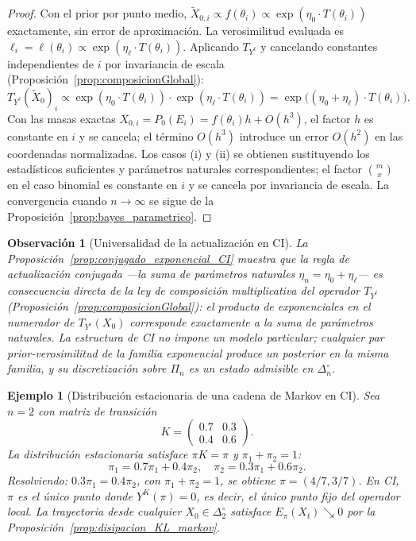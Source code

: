 ﻿\documentclass[12pt]{article}
\newtheorem{observacion}{Observación}[section]
\newtheorem{ejemplo}{Ejemplo}[section]
\begin{document}
\begin{proof}
Con el prior por punto medio, $\widetilde X_{0,i}\propto f(\theta_i)\propto\exp(\eta_0\cdot T(\theta_i))$ exactamente, sin error de aproximación. La verosimilitud evaluada es $\ell_i=\ell(\theta_i)\propto\exp(\eta_\ell\cdot T(\theta_i))$. Aplicando $T_{Y^\ell}$ y cancelando constantes independientes de $i$ por invariancia de escala (Proposición~\ref{prop:composicionGlobal}):
\[
T_{Y^\ell}(\widetilde X_0)_i
\propto \exp(\eta_0\cdot T(\theta_i))\cdot\exp(\eta_\ell\cdot T(\theta_i))
= \exp\bigl((\eta_0+\eta_\ell)\cdot T(\theta_i)\bigr).
\]
Con las masas exactas $X_{0,i}=P_0(E_i)=f(\theta_i)h+O(h^3)$, el factor $h$ es constante en $i$ y se cancela; el término $O(h^3)$ introduce un error $O(h^2)$ en las coordenadas normalizadas. Los casos (i) y (ii) se obtienen sustituyendo los estadísticos suficientes y parámetros naturales correspondientes; el factor $\binom{m}{x}$ en el caso binomial es constante en $i$ y se cancela por invariancia de escala. La convergencia cuando $n\to\infty$ se sigue de la Proposición~\ref{prop:bayes_parametrico}.
\end{proof}

\begin{observacion}[Universalidad de la actualización en CI]\label{obs:universalidad}
La Proposición~\ref{prop:conjugado_exponencial_CI} muestra que la regla de actualización conjugada ---la suma de parámetros naturales $\eta_n=\eta_0+\eta_\ell$--- es consecuencia directa de la ley de composición multiplicativa del operador $T_{Y^\ell}$ (Proposición~\ref{prop:composicionGlobal}): el producto de exponenciales en el numerador de $T_{Y^\ell}(X_0)$ corresponde exactamente a la suma de parámetros naturales. La estructura de CI no impone un modelo particular; cualquier par prior-verosimilitud de la familia exponencial produce un posterior en la misma familia, y su discretización sobre $\Pi_n$ es un estado admisible en $\Delta_n^\circ$.
\end{observacion}

\begin{ejemplo}[Distribución estacionaria de una cadena de Markov en CI]\label{ej:estacionaria}
Sea $n=2$ con matriz de transición
\[
K = \begin{pmatrix} 0.7 & 0.3 \\ 0.4 & 0.6 \end{pmatrix}.
\]
La distribución estacionaria satisface $\pi K = \pi$ y $\pi_1+\pi_2=1$:
\[
\pi_1 = 0.7\pi_1 + 0.4\pi_2, \quad \pi_2 = 0.3\pi_1 + 0.6\pi_2.
\]
Resolviendo: $0.3\pi_1 = 0.4\pi_2$, con $\pi_1+\pi_2=1$, se obtiene $\pi = (4/7, 3/7)$. En CI, $\pi$ es el único punto donde $Y^K(\pi)=0$, es decir, el único punto fijo del operador local. La trayectoria desde cualquier $X_0\in\Delta_2^\circ$ satisface $E_\pi(X_t)\searrow 0$ por la Proposición~\ref{prop:disipacion_KL_markov}.
\end{ejemplo}
\end{document}
